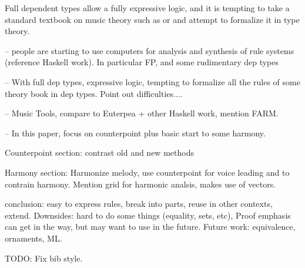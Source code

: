 Full dependent types allow a fully expressive logic, and it is
tempting to take a standard textbook on music theory such as
\citet{piston-harmony} or \citet{aldwell2018harmony} and attempt to
formalize it in type theory.




-- people are starting to use computers for analysis and synthesis of rule systems
(reference Haskell work). In particular FP, and some rudimentary dep types

-- With full dep types, expressive logic, tempting to formalize all the rules
of some theory book in dep types. Point out difficulties....

-- Music Tools, compare to Euterpea + other Haskell work, mention FARM.

-- In this paper, focus on counterpoint plus basic start to some harmony.


Counterpoint section: contrast old and new methods

Harmony section: Harmonize melody, use counterpoint for voice leading and to contrain harmony.
Mention grid for harmonic analsis, makes use of vectors.

conclusion: easy to express rules, break into parts, reuse in other contexts, extend.
Downsides: hard to do some things (equality, sets, etc), Proof emphasis can get in the way, but
may want to use in the future. Future work: equivalence, ornaments, ML.

TODO: Fix bib style.
